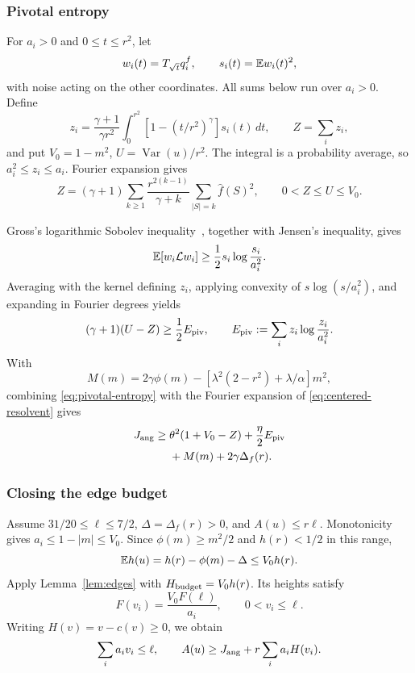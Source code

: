 \subsubsection{Pivotal entropy}

For \(a_i>0\) and \(0\le t\le r^2\), let
\[
 w_i(t)=T_{\sqrt t}q_i^f,\qquad s_i(t)=\mathbb E w_i(t)^2,
\]
with noise acting on the other coordinates. All sums below run over
\(a_i>0\). Define
\[
 z_i=\frac{\gamma+1}{\gamma r^2}
       \int_0^{r^2}[1-(t/r^2)^\gamma]s_i(t)\,dt,
 \qquad Z=\sum_i z_i,
\]
and put \(V_0=1-m^2\), \(U=\operatorname{Var}(u)/r^2\).
The integral is a probability average, so \(a_i^2\le z_i\le a_i\).
Fourier expansion gives
\[
 Z=(\gamma+1)\sum_{k\ge1}
       \frac{r^{2(k-1)}}{\gamma+k}
       \sum_{|S|=k}\widehat f(S)^2,
 \qquad 0<Z\le U\le V_0.
\]

Gross's logarithmic Sobolev inequality~\cite{Gross,ODonnell},
together with Jensen's inequality, gives
\[
 \mathbb E[w_i\mathcal L w_i]\ge
       \frac12 s_i\log\frac{s_i}{a_i^2}.
\]
Averaging with the kernel defining \(z_i\), applying convexity of
\(s\log(s/a_i^2)\), and expanding in Fourier degrees yields
\begin{equation}
 (\gamma+1)(U-Z)\ge\frac12 E_{\rm piv},\qquad
 E_{\rm piv}:=\sum_i z_i\log\frac{z_i}{a_i^2}.
 \label{eq:pivotal-entropy}
\end{equation}
With
\[
 M(m)=2\gamma\phi(m)
       -[\lambda^2(2-r^2)+\lambda/\alpha]m^2,
\]
combining \eqref{eq:pivotal-entropy} with the Fourier expansion of
\eqref{eq:centered-resolvent} gives
\begin{equation}
 \begin{split}
 J_{\rm ang}\ge{}&\theta^2(1+V_0-Z)+\frac\eta2 E_{\rm piv}\\
 &+M(m)+2\gamma\Delta_f(r).
 \end{split}
 \label{eq:pivotal-baseline}
\end{equation}

\subsubsection{Closing the edge budget}

Assume \(31/20\le\ell\le7/2\), \(\Delta=\Delta_f(r)>0\), and
\(A(u)\le r\ell\). Monotonicity gives \(a_i\le1-|m|\le V_0\).
Since \(\phi(m)\ge m^2/2\) and \(h(r)<1/2\) in this range,
\[
 \mathbb E h(u)=h(r)-\phi(m)-\Delta\le V_0h(r).
\]
Apply Lemma~\ref{lem:edges} with \(H_{\rm budget}=V_0h(r)\).
Its heights satisfy
\[
 F(v_i)=\frac{V_0F(\ell)}{a_i},\qquad 0<v_i\le\ell.
\]
Writing \(H(v)=v-c(v)\ge0\), we obtain
\begin{equation}
 \sum_i a_iv_i\le\ell,\qquad
 A(u)\ge J_{\rm ang}+r\sum_i a_iH(v_i).
 \label{eq:adjusted-edge}
\end{equation}

